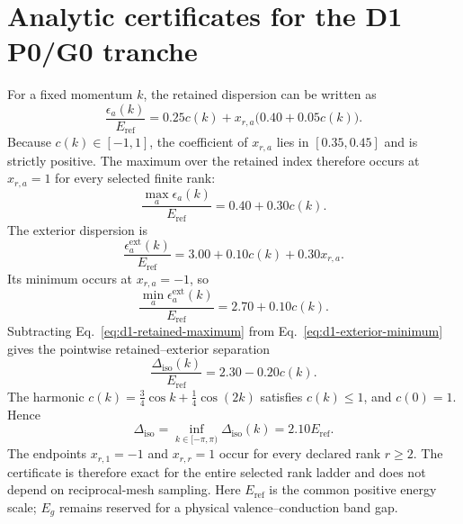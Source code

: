 \section{Analytic certificates for the D1 P0/G0 tranche}
\label{app:d1-gap-certificate}
For a fixed momentum $k$, the retained dispersion can be written as
\begin{equation}
 \frac{\epsilon_a(k)}{E_{\mathrm{ref}}}
 =0.25c(k)+x_{r,a}\bigl(0.40+0.05c(k)\bigr).
 \label{eq:d1-retained-gap-certificate}
\end{equation}
Because $c(k)\in[-1,1]$, the coefficient of $x_{r,a}$ lies in
$[0.35,0.45]$ and is strictly positive. The maximum over the retained index therefore
occurs at $x_{r,a}=1$ for every selected finite rank:
\begin{equation}
 \frac{\max_a\epsilon_a(k)}{E_{\mathrm{ref}}}
 =0.40+0.30c(k).
 \label{eq:d1-retained-maximum}
\end{equation}
The exterior dispersion is
\begin{equation}
 \frac{\epsilon_a^{\mathrm{ext}}(k)}{E_{\mathrm{ref}}}
 =3.00+0.10c(k)+0.30x_{r,a}.
\end{equation}
Its minimum occurs at $x_{r,a}=-1$, so
\begin{equation}
 \frac{\min_a\epsilon_a^{\mathrm{ext}}(k)}{E_{\mathrm{ref}}}
 =2.70+0.10c(k).
 \label{eq:d1-exterior-minimum}
\end{equation}
Subtracting Eq.~\eqref{eq:d1-retained-maximum} from
Eq.~\eqref{eq:d1-exterior-minimum} gives the pointwise retained--exterior separation
\begin{equation}
 \frac{\Delta_{\mathrm{iso}}(k)}{E_{\mathrm{ref}}}=2.30-0.20c(k).
 \label{eq:d1-pointwise-gap}
\end{equation}
The harmonic $c(k)=\tfrac34\cos k+\tfrac14\cos(2k)$ satisfies $c(k)\leq1$, and
$c(0)=1$. Hence
\begin{equation}
 \Delta_{\mathrm{iso}}
 =\inf_{k\in[-\pi,\pi)}\Delta_{\mathrm{iso}}(k)
 =2.10E_{\mathrm{ref}}.
 \label{eq:d1-exact-gap}
\end{equation}
The endpoints $x_{r,1}=-1$ and $x_{r,r}=1$ occur for every declared rank $r\geq2$.
The certificate is therefore exact for the entire selected rank ladder and does not
depend on reciprocal-mesh sampling. Here $E_{\mathrm{ref}}$ is the common positive
energy scale; $E_g$ remains reserved for a physical valence--conduction band gap.

